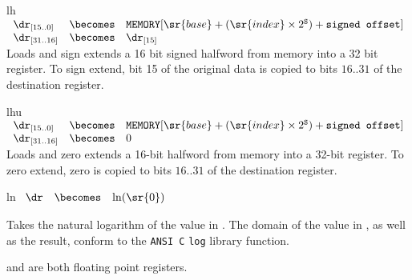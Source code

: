 \begin{instruction}{lh}
     {\lhopc}
     {
       \begin{math}
         \begin{array}{lcl}
           {\dr}_{[15..0]} & \becomes & \texttt{MEMORY}[\sr{base} +
            (\sr{index} \times 2^{\texttt{S}}) + \texttt{signed offset}] \\
           {\dr}_{[31..16]} & \becomes & {\dr}_{[15]} \\
         \end{array}
       \end{math}
     }
     {
       Loads and sign extends a 16 bit signed halfword from memory
       into a 32 bit register.  To sign extend, bit 15 of
       the original data is copied to bits ${16..31}$ of the
       destination register.
     }
\end{instruction}

\begin{instruction}{lhu}
     {\lhuopc}
     {
       \begin{math}
         \begin{array}{lcl}
           {\dr}_{[15..0]} & \becomes & \texttt{MEMORY}[\sr{base} +
            (\sr{index} \times 2^{\texttt{S}}) + \texttt{signed offset}] \\
           {\dr}_{[31..16]} & \becomes & 0 \\
         \end{array}
       \end{math}
     }
     {
       Loads and zero extends a 16-bit halfword from memory into a
       32-bit register.  To zero extend, zero is copied to bits
       ${16..31}$ of the destination register.
     }
\end{instruction}


\begin{instruction}{ln}
     {\lnopc}
     {
       \begin{math}
         \begin{array}{lcl}
           \dr & \becomes & \ln(\sr{0})
         \end{array}
       \end{math}
     }
     {Takes the natural logarithm of the value in .  The domain
     of the value in \texttt{}, as well as the result, conform
     to the \texttt{ANSI C} \texttt{log} library function.

      and \dr are both floating point registers.}
\end{instruction}


